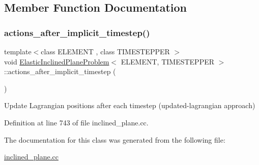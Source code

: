 \subsection{Member Function Documentation}
\mbox{\label{classElasticInclinedPlaneProblem_a7e61d0cb5e10b7e98f949a43749477a6}} 
\subsubsection{\texorpdfstring{actions\+\_\+after\+\_\+implicit\+\_\+timestep()}{actions\_after\_implicit\_timestep()}}
{\footnotesize\ttfamily template$<$class E\+L\+E\+M\+E\+NT , class T\+I\+M\+E\+S\+T\+E\+P\+P\+ER $>$ \\
void \hyperlink{classElasticInclinedPlaneProblem}{Elastic\+Inclined\+Plane\+Problem}$<$ E\+L\+E\+M\+E\+NT, T\+I\+M\+E\+S\+T\+E\+P\+P\+ER $>$\+::actions\+\_\+after\+\_\+implicit\+\_\+timestep (\begin{DoxyParamCaption}{ }\end{DoxyParamCaption})\hspace{0.3cm}{\ttfamily [inline]}}



Update Lagrangian positions after each timestep (updated-\/lagrangian approach) 



Definition at line 743 of file inclined\+\_\+plane.\+cc.



The documentation for this class was generated from the following file\+:\begin{DoxyCompactItemize}
\item 
\hyperlink{inclined__plane_8cc}{inclined\+\_\+plane.\+cc}\end{DoxyCompactItemize}
